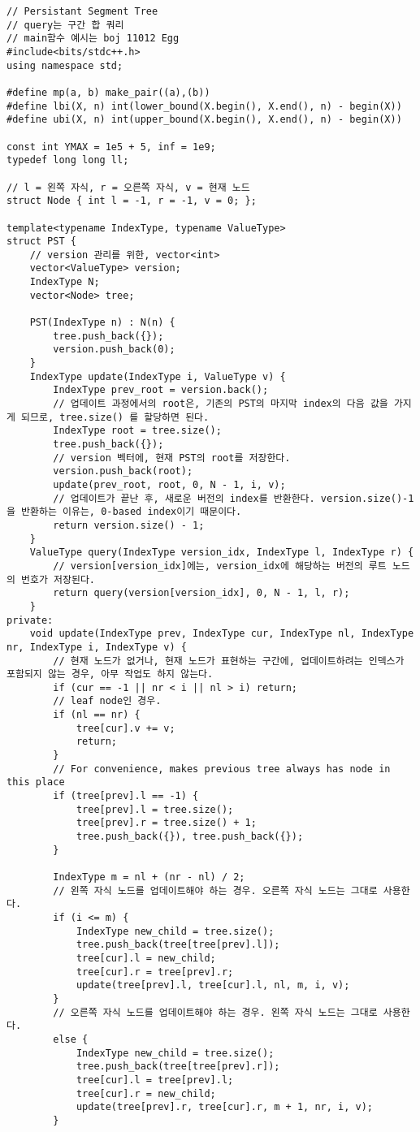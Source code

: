 \documentclass[landscape, 8pt, a4paper, oneside, twocolumn]{extarticle}
\begin{document}
    \begin{verbatim}
// Persistant Segment Tree
// query는 구간 합 쿼리
// main함수 예시는 boj 11012 Egg
#include<bits/stdc++.h>
using namespace std;

#define mp(a, b) make_pair((a),(b))
#define lbi(X, n) int(lower_bound(X.begin(), X.end(), n) - begin(X))
#define ubi(X, n) int(upper_bound(X.begin(), X.end(), n) - begin(X))

const int YMAX = 1e5 + 5, inf = 1e9;
typedef long long ll;

// l = 왼쪽 자식, r = 오른쪽 자식, v = 현재 노드
struct Node { int l = -1, r = -1, v = 0; };

template<typename IndexType, typename ValueType>
struct PST {
    // version 관리를 위한, vector<int>
    vector<ValueType> version;
    IndexType N;
    vector<Node> tree;

    PST(IndexType n) : N(n) {
        tree.push_back({});
        version.push_back(0);
    }
    IndexType update(IndexType i, ValueType v) {
        IndexType prev_root = version.back();
        // 업데이트 과정에서의 root은, 기존의 PST의 마지막 index의 다음 값을 가지게 되므로, tree.size() 를 할당하면 된다.
        IndexType root = tree.size();
        tree.push_back({});
        // version 벡터에, 현재 PST의 root를 저장한다.
        version.push_back(root);
        update(prev_root, root, 0, N - 1, i, v);
        // 업데이트가 끝난 후, 새로운 버전의 index를 반환한다. version.size()-1을 반환하는 이유는, 0-based index이기 때문이다.
        return version.size() - 1;
    }
    ValueType query(IndexType version_idx, IndexType l, IndexType r) {
        // version[version_idx]에는, version_idx에 해당하는 버전의 루트 노드의 번호가 저장된다.
        return query(version[version_idx], 0, N - 1, l, r);
    }
private:
    void update(IndexType prev, IndexType cur, IndexType nl, IndexType nr, IndexType i, IndexType v) {
        // 현재 노드가 없거나, 현재 노드가 표현하는 구간에, 업데이트하려는 인덱스가 포함되지 않는 경우, 아무 작업도 하지 않는다.
        if (cur == -1 || nr < i || nl > i) return;
        // leaf node인 경우.
        if (nl == nr) {
            tree[cur].v += v;
            return;
        }
        // For convenience, makes previous tree always has node in this place
        if (tree[prev].l == -1) {
            tree[prev].l = tree.size();
            tree[prev].r = tree.size() + 1;
            tree.push_back({}), tree.push_back({});
        }

        IndexType m = nl + (nr - nl) / 2;
        // 왼쪽 자식 노드를 업데이트해야 하는 경우. 오른쪽 자식 노드는 그대로 사용한다.
        if (i <= m) {
            IndexType new_child = tree.size();
            tree.push_back(tree[tree[prev].l]);
            tree[cur].l = new_child;
            tree[cur].r = tree[prev].r;
            update(tree[prev].l, tree[cur].l, nl, m, i, v);
        }
        // 오른쪽 자식 노드를 업데이트해야 하는 경우. 왼쪽 자식 노드는 그대로 사용한다.
        else {
            IndexType new_child = tree.size();
            tree.push_back(tree[tree[prev].r]);
            tree[cur].l = tree[prev].l;
            tree[cur].r = new_child;
            update(tree[prev].r, tree[cur].r, m + 1, nr, i, v);
        }


\end{verbatim}
\end{document}

